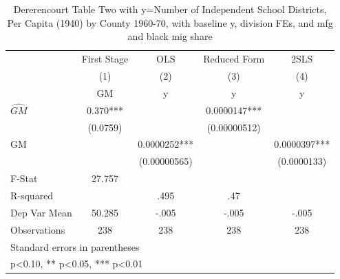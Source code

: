 \begin{table}[htbp]\centering
\def\sym#1{\ifmmode^{#1}\else\(^{#1}\)\fi}
\caption{Dererencourt Table Two with y=Number of Independent School Districts, Per Capita (1940) by County 1960-70, with baseline y, division FEs, and mfg and black mig share}
\begin{tabular}{l*{4}{c}}
\toprule
                    & First Stage   &         OLS   &Reduced Form   &        2SLS   \\
                    &\multicolumn{1}{c}{(1)}&\multicolumn{1}{c}{(2)}&\multicolumn{1}{c}{(3)}&\multicolumn{1}{c}{(4)}\\
                    &\multicolumn{1}{c}{GM}&\multicolumn{1}{c}{y}&\multicolumn{1}{c}{y}&\multicolumn{1}{c}{y}\\
\midrule
$\hat{GM}$          &       0.370***&               &   0.0000147***&               \\
                    &    (0.0759)   &               &(0.00000512)   &               \\
\addlinespace
GM                  &               &   0.0000252***&               &   0.0000397***\\
                    &               &(0.00000565)   &               & (0.0000133)   \\
\midrule
F-Stat              &      27.757   &               &               &               \\
R-squared           &               &        .495   &         .47   &               \\
Dep Var Mean        &      50.285   &       -.005   &       -.005   &       -.005   \\
Observations        &         238   &         238   &         238   &         238   \\
\bottomrule
\multicolumn{5}{l}{\footnotesize Standard errors in parentheses}\\
\multicolumn{5}{l}{\footnotesize * p<0.10, ** p<0.05, *** p<0.01}\\
\end{tabular}
\end{table}
